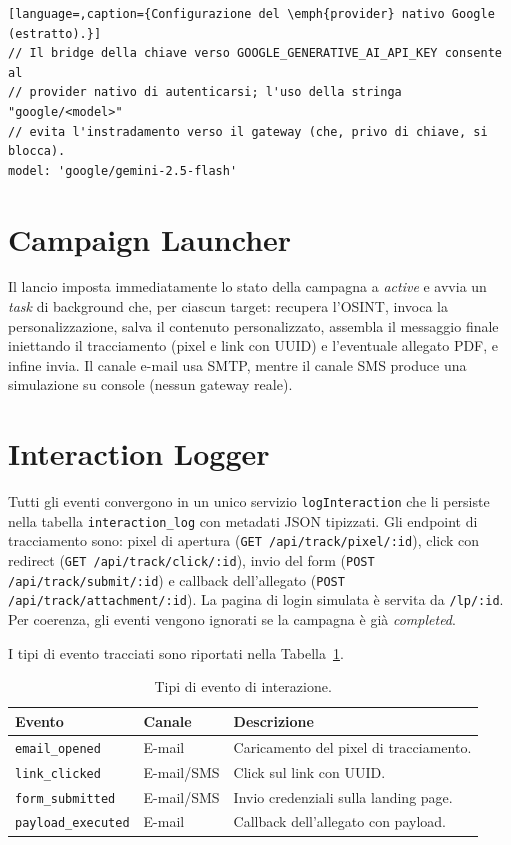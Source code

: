 \documentclass[12pt,a4paper,oneside]{report}
\newcommand{\code}[1]{\texttt{\small #1}}
\begin{document}
\begin{lstlisting}[language=,caption={Configurazione del \emph{provider} nativo Google (estratto).}]
// Il bridge della chiave verso GOOGLE_GENERATIVE_AI_API_KEY consente al
// provider nativo di autenticarsi; l'uso della stringa "google/<model>"
// evita l'instradamento verso il gateway (che, privo di chiave, si blocca).
model: 'google/gemini-2.5-flash'
\end{lstlisting}

\section{Campaign Launcher}
Il lancio imposta immediatamente lo stato della campagna a \emph{active} e avvia un
\emph{task} di background che, per ciascun target: recupera l'OSINT, invoca la
personalizzazione, salva il contenuto personalizzato, assembla il messaggio finale
iniettando il tracciamento (pixel e link con UUID) e l'eventuale allegato PDF, e infine
invia. Il canale e-mail usa SMTP, mentre il canale SMS produce una simulazione su console
(nessun gateway reale).

\section{Interaction Logger}
Tutti gli eventi convergono in un unico servizio \code{logInteraction} che li persiste nella
tabella \code{interaction\_log} con metadati JSON tipizzati. Gli endpoint di tracciamento
sono: pixel di apertura (\code{GET /api/track/pixel/:id}), click con redirect
(\code{GET /api/track/click/:id}), invio del form (\code{POST /api/track/submit/:id}) e
callback dell'allegato (\code{POST /api/track/attachment/:id}). La pagina di login simulata
\`e servita da \code{/lp/:id}. Per coerenza, gli eventi vengono ignorati se la campagna \`e
gi\`a \emph{completed}.

I tipi di evento tracciati sono riportati nella Tabella~\ref{tab:events}.

\begin{table}[h]
\centering
\caption{Tipi di evento di interazione.}
\label{tab:events}
\small
\begin{tabular}{@{}p{3.6cm}p{4.2cm}p{5.4cm}@{}}
\toprule
\textbf{Evento} & \textbf{Canale} & \textbf{Descrizione} \\
\midrule
\code{email\_opened}   & E-mail       & Caricamento del pixel di tracciamento. \\
\code{link\_clicked}   & E-mail/SMS   & Click sul link con UUID. \\
\code{form\_submitted} & E-mail/SMS   & Invio credenziali sulla landing page. \\
\code{payload\_executed} & E-mail     & Callback dell'allegato con payload. \\
\bottomrule
\end{tabular}
\end{table}
\end{document}
